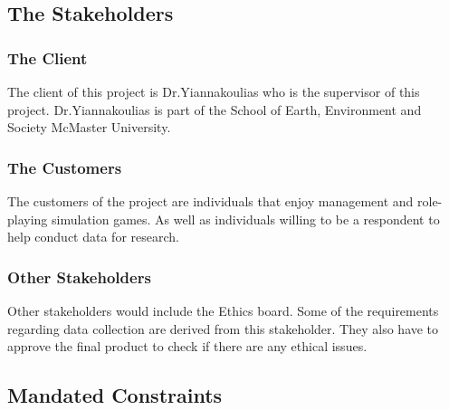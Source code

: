 \documentclass{article}
\begin{document}
\subsection{The Stakeholders}

\subsubsection{The Client}
The client of this project is Dr.Yiannakoulias who is the supervisor of this project. 
Dr.Yiannakoulias is part of the School of Earth, Environment and Society McMaster University.

\subsubsection{The Customers}
The customers of the project are individuals that enjoy management and role-playing simulation games. 
As well as individuals willing to be a respondent to help conduct data for research.

\subsubsection{Other Stakeholders}
Other stakeholders would include the Ethics board. 
Some of the requirements regarding data collection are derived from this stakeholder. 
They also have to approve the final product to check if there are any ethical issues.

\subsection{Mandated Constraints}
\end{document}
